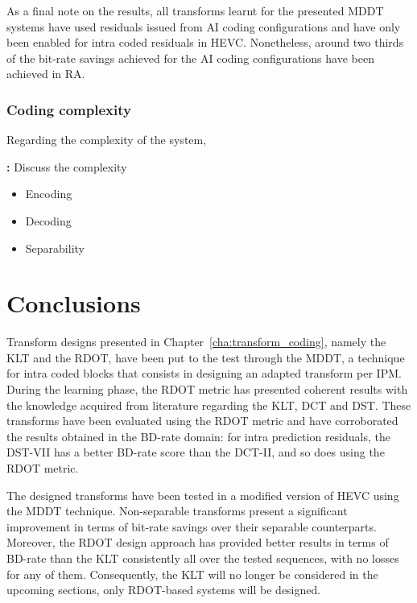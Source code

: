 \documentclass[11pt,a4paper,openright,twoside]{book}
\providecommand{\todo}[1]{
	\begin{center}
		\colorbox{yellowish}{
			\begin{minipage}{0.95\linewidth}
				\textbf{\color{redish}{TODO}:} #1
			\end{minipage}
		}
	\end{center}
}
\numberwithin{equation}{section} %
\numberwithin{figure}{section} %
\numberwithin{table}{section} %
\begin{document}
As a final note on the results, all transforms learnt for the presented
\ac{MDDT} systems have used residuals issued from \ac{AI} coding
configurations and have only been enabled for intra coded residuals in
\ac{HEVC}.
Nonetheless, around two thirds of the bit-rate savings achieved for the
\ac{AI} coding configurations have been achieved in \ac{RA}.

\subsubsection{Coding complexity}
\label{ssub:mddt_coding_complexity}

Regarding the complexity of the system,
\todo{Discuss the complexity
\begin{itemize}
	\item Encoding
	\item Decoding
	\item Separability
\end{itemize}
}


\section{Conclusions}
\label{sec:conclusions}

Transform designs presented in Chapter~\ref{cha:transform_coding}, namely the
\ac{KLT} and the \ac{RDOT}, have been put to the test through the \ac{MDDT}, a
technique for intra coded blocks that consists in designing an adapted
transform per \ac{IPM}.
During the learning phase, the \ac{RDOT} metric has presented coherent results
with the knowledge acquired from literature regarding the \ac{KLT}, \ac{DCT}
and \ac{DST}.
These transforms have been evaluated using the \ac{RDOT} metric and have
corroborated the results obtained in the \ac{BD}-rate domain:
for intra prediction residuals, the \ac{DST}-VII has a better \ac{BD}-rate
score than the \ac{DCT}-II, and so does using the \ac{RDOT} metric.

The designed transforms have been tested in a modified version of \ac{HEVC}
using the \ac{MDDT} technique.
Non-separable transforms present a significant improvement in terms of
bit-rate savings over their separable counterparts.
Moreover, the \ac{RDOT} design approach has provided better results in terms
of \ac{BD}-rate than the \ac{KLT} consistently all over the tested sequences,
with no losses for any of them.
Consequently, the \ac{KLT} will no longer be considered in the upcoming
sections, only \ac{RDOT}-based systems will be designed.
\end{document}
